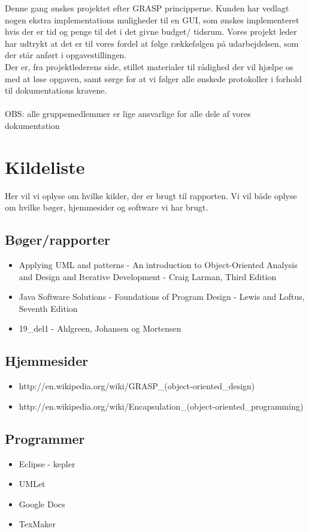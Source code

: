 \documentclass{article}
\begin{document}
Denne gang ønskes projektet efter GRASP principperne. 
Kunden har vedlagt nogen ekstra implementations muligheder til en GUI, som ønskes
implementeret hvis der er tid og penge til det i det givne budget/ tidsrum.
Vores projekt leder har udtrykt at det er til vores fordel at følge rækkefølgen
på udarbejdelsen, som der står anført i opgavestillingen.
\\
Der er, fra projektlederens side, stillet materialer til rådighed der vil
hjælpe os med at løse opgaven, samt sørge for at vi følger alle ønskede
protokoller i forhold til dokumentations kravene.
\\\\
OBS: alle gruppemedlemmer er lige ansvarlige for alle dele af vores dokumentation










\section{Kildeliste}
Her vil vi oplyse om hvilke kilder, der er brugt til rapporten.
Vi vil både oplyse om hvilke bøger, hjemmesider og software vi har brugt.
\printbibliography
\subsection{Bøger/rapporter}
\begin{itemize}
\item Applying UML and patterns - An introduction to Object-Oriented Analysis and Design and Iterative Development - Craig Larman, Third Edition
\item Java Software Solutions -  Foundations of Program Design - Lewis and Loftus, Seventh Edition
\item 19\_del1 - Ahlgreen, Johansen og Mortensen
\end{itemize}
\subsection{Hjemmesider}
\begin{itemize}
\item http://en.wikipedia.org/wiki/GRASP\_(object-oriented\_design)
\item http://en.wikipedia.org/wiki/Encapsulation\_(object-oriented\_programming)
\end{itemize}
\subsection{Programmer}
\begin{itemize}
\item Eclipse - kepler
\item UMLet
\item Google Docs
\item TexMaker
\end{itemize}
\newpage
\end{document}
